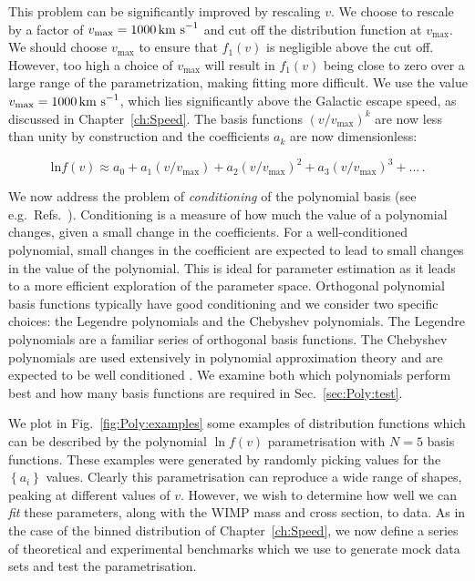 This problem can be significantly improved by rescaling $v$. We choose to rescale by a factor of $v_\textrm{max} = 1000 \,\textrm{km s}^{-1}$ and cut off the distribution function at $v_\textrm{max}$. We should choose $v_\textrm{max}$ to ensure that $f_1(v)$ is negligible above the cut off. However, too high a choice of $v_\textrm{max}$ will result in $f_1(v)$ being close to zero over a large range of the parametrization, making fitting more difficult. We use the value $v_\textrm{max} = 1000 \,\textrm{km s}^{-1}$, which lies significantly above the Galactic escape speed, as discussed in Chapter~\ref{ch:Speed}. The basis functions $(v/v_\textrm{max})^k$ are now less than unity by construction and the coefficients $a_k$ are now dimensionless:

\begin{equation}
\textrm{ln}f(v) \approx a_0 + a_1 (v/v_\textrm{max}) + a_2 (v/v_\textrm{max})^2 + a_3 (v/v_\textrm{max})^3 + ...\,.
\end{equation}

We now address the problem of \textit{conditioning} of the polynomial basis (see e.g.\ Refs.~\cite{Gautschi:1978, Wilkinson:1984}). Conditioning is a measure of how much the value of a polynomial changes, given a small change in the coefficients. For a well-conditioned polynomial, small changes in the coefficient are expected to lead to small changes in the value of the polynomial. This is ideal for parameter estimation as it leads to a more efficient exploration of the parameter space. Orthogonal polynomial basis functions typically have good conditioning \cite{Gautschi:1978} and we consider two specific choices: the Legendre polynomials and the Chebyshev polynomials. The Legendre polynomials are a familiar series of orthogonal basis functions. The Chebyshev polynomials are used extensively in polynomial approximation theory \cite{Mason:2002} and are expected to be well conditioned \cite{Gautschi:1978}. We examine both which polynomials perform best and how many basis functions are required in Sec.~\ref{sec:Poly:test}.

We plot in Fig.~\ref{fig:Poly:examples} some examples of distribution functions which can be described by the polynomial $\ln f(v)$ parametrisation with $N=5$ basis functions. These examples were generated by randomly picking values for the $\left\{a_i\right\}$ values. Clearly this parametrisation can reproduce a wide range of shapes, peaking at different values of $v$. However, we wish to determine how well we can \textit{fit} these parameters, along with the WIMP mass and cross section, to data. As in the case of the binned distribution of Chapter~\ref{ch:Speed}, we now define a series of theoretical and experimental benchmarks which we use to generate mock data sets and test the parametrisation.


